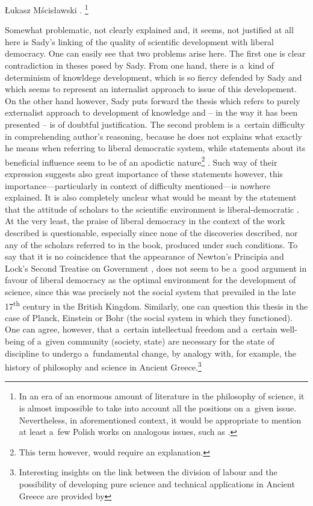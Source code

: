 \begin{newrevengenv}{Łukasz Mścisławski}
\parencite[cf.][p.13]{sady_struktura_2020}.%
\footnote{In an era of an enormous amount of literature in the philosophy of science, it is almost impossible to take into account all the positions on a~given issue. Nevertheless, in aforementioned context, it would be appropriate to mention at least a~few Polish works on analogous issues, such as 
\parencite[][]{kokowski_proba_1993}.%
}

Somewhat problematic, not clearly explained and, it seems, not justified at all here is Sady's linking of the quality of scientific development with liberal democracy. One can easily see that two problems arise here. The first one is clear contradiction in theses posed by Sady. From one hand, there is a~kind of determinism of knowldege development, which is so fiercy defended by Sady and which seems to represent an internalist approach to issue of this developement. On the other hand however, Sady puts forward the thesis which refers to purely externalist approach to development of knowledge and -- in the way it has been presented -- is of doubtful justification. The second problem is a~certain difficulty in comprehending author's reasoning, because he does not explains what exactly he means when referring to liberal democratic system, while statements about its beneficial influence seem to be of an apodictic nature\footnote{This term however, would require an explanation.}
\parencite[cf.][pp.20--21]{sady_struktura_2020}. %
 Such way of their expression suggests also great importance of these statements however, this importance---particularly in context of difficulty mentioned---is nowhere explained. It is also completely unclear what would be meant by the statement that the attitude of scholars to the scientific environment is liberal-democratic 
\parencite[][p.20]{sady_struktura_2020}. %
 At the very least, the praise of liberal democracy in the context of the work described is questionable, especially since none of the discoveries described, nor any of the scholars referred to in the book, produced under such conditions. To say that it is no coincidence that the appearance of Newton's Principia and Lock's Second Treatise on Government 
\parencite[][p.21]{sady_struktura_2020}, %
 does not seem to be a~good argument in favour of liberal democracy as the optimal environment for the development of science, since this was precisely not the social system that prevailed in the late 17\textsuperscript{th} century in the British Kingdom. Similarly, one can question this thesis in the case of Planck, Einstein or Bohr (the social system in which they functioned). One can agree, however, that a~certain intellectual freedom and a~certain well-being of a~given community (society, state) are necessary for the state of discipline to undergo a~fundamental change, by analogy with, for example, the history of philosophy and science in Ancient Greece.\footnote{Interesting insights on the link between the division of labour and the possibility of developing pure science and technical applications in Ancient Greece are provided by 
}
\end{newrevengenv}
